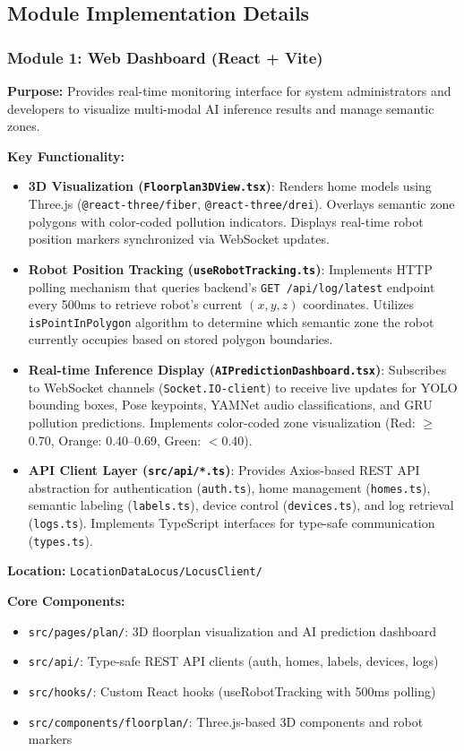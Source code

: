 \documentclass[conference]{IEEEtran}
\begin{document}
\subsection{Module Implementation Details}

\subsubsection{Module 1: Web Dashboard (React + Vite)}

\textbf{Purpose:} Provides real-time monitoring interface for system administrators and developers to visualize multi-modal AI inference results and manage semantic zones.

\textbf{Key Functionality:}
\begin{itemize}
    \item \textbf{3D Visualization (\texttt{Floorplan3DView.tsx})}: Renders home models using Three.js (\texttt{@react-three/fiber}, \texttt{@react-three/drei}). Overlays semantic zone polygons with color-coded pollution indicators. Displays real-time robot position markers synchronized via WebSocket updates.
    \item \textbf{Robot Position Tracking (\texttt{useRobotTracking.ts})}: Implements HTTP polling mechanism that queries backend's \texttt{GET /api/log/latest} endpoint every 500ms to retrieve robot's current $(x, y, z)$ coordinates. Utilizes \texttt{isPointInPolygon} algorithm to determine which semantic zone the robot currently occupies based on stored polygon boundaries.
    \item \textbf{Real-time Inference Display (\texttt{AIPredictionDashboard.tsx})}: Subscribes to WebSocket channels (\texttt{Socket.IO-client}) to receive live updates for YOLO bounding boxes, Pose keypoints, YAMNet audio classifications, and GRU pollution predictions. Implements color-coded zone visualization (Red: $\geq$0.70, Orange: 0.40–0.69, Green: $<$0.40).
    \item \textbf{API Client Layer (\texttt{src/api/*.ts})}: Provides Axios-based REST API abstraction for authentication (\texttt{auth.ts}), home management (\texttt{homes.ts}), semantic labeling (\texttt{labels.ts}), device control (\texttt{devices.ts}), and log retrieval (\texttt{logs.ts}). Implements TypeScript interfaces for type-safe communication (\texttt{types.ts}).
\end{itemize}

\textbf{Location:} \texttt{LocationDataLocus/LocusClient/}

\textbf{Core Components:}
\begin{itemize}
    \item \texttt{src/pages/plan/}: 3D floorplan visualization and AI prediction dashboard
    \item \texttt{src/api/}: Type-safe REST API clients (auth, homes, labels, devices, logs)
    \item \texttt{src/hooks/}: Custom React hooks (useRobotTracking with 500ms polling)
    \item \texttt{src/components/floorplan/}: Three.js-based 3D components and robot markers
\end{itemize}
\end{document}
